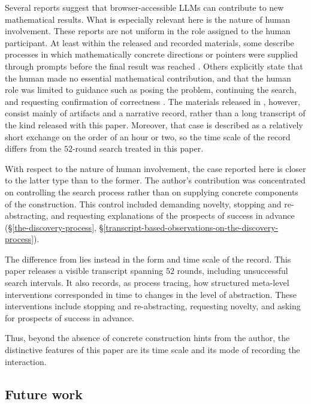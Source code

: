 \documentclass[11pt]{article}
\theoremstyle{definition}
\theoremstyle{remark}
\renewcommand{\_}{\textunderscore\allowbreak}
\begin{document}
Several reports suggest that browser-accessible LLMs can contribute to
new mathematical results. What is especially relevant here is the nature
of human involvement. These reports are not uniform in the role assigned
to the human participant. At least within the released and recorded
materials, some describe processes in which mathematically concrete
directions or pointers were supplied through prompts before the final
result was reached \cite{Salim2025, Verbeken2026}. Others explicitly
state that the human made no essential mathematical contribution, and
that the human role was limited to guidance such as posing the problem,
continuing the search, and requesting confirmation of correctness
\cite{Gowers2026}. The materials released in \cite{Gowers2026}, however,
consist mainly of artifacts and a narrative record, rather than a long
transcript of the kind released with this paper. Moreover, that
case is described as a relatively short exchange on the order of an hour or two, so the time scale of the record differs from the \(52\)-round
search treated in this paper.

With respect to the nature of human involvement, the case reported here
is closer to the latter type than to the former. The author's
contribution was concentrated on controlling the search process rather
than on supplying concrete components of the construction. This control
included demanding novelty, stopping and re-abstracting, and requesting
explanations of the prospects of success in advance (\S\ref{the-discovery-process}, \S\ref{transcript-based-observations-on-the-discovery-process}).

The difference from \cite{Gowers2026} lies instead in the form and time
scale of the record. This paper releases a visible transcript spanning
\(52\) rounds, including unsuccessful search intervals. It also records,
as process tracing, how structured meta-level interventions corresponded
in time to changes in the level of abstraction. These interventions
include stopping and re-abstracting, requesting novelty, and asking for
prospects of success in advance.

Thus, beyond the absence of concrete construction hints
from the author, the distinctive features of this paper are its time
scale and its mode of recording the interaction.

\subsection{Future work}\label{future-work}
\end{document}
